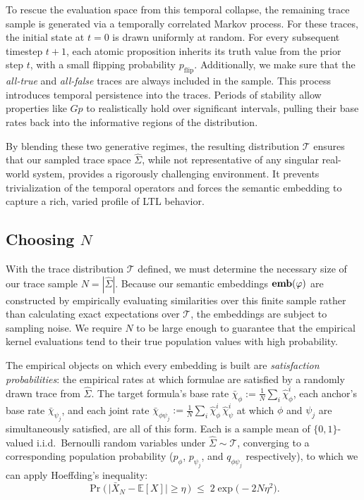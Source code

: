 \documentclass[titlepage,a4paper,11pt]{report}
\begin{document}
    To rescue the evaluation space from this temporal collapse, the remaining trace sample is generated via a temporally correlated Markov process. For these traces, the initial state at $t=0$ is drawn uniformly at random. For every subsequent timestep $t+1$, each atomic proposition inherits its truth value from the prior step $t$, with a small flipping probability $p_{\text{flip}}$. Additionally, we make sure that the \textit{all-true} and \textit{all-false} traces are always included in the sample. This process introduces temporal persistence into the traces. Periods of stability allow properties like $G p$ to realistically hold over significant intervals, pulling their base rates back into the informative regions of the distribution. 
    
    By blending these two generative regimes, the resulting distribution $\mathcal{T}$ ensures that our sampled trace space $\widehat \Sigma$, while not representative of any singular real-world system, provides a rigorously challenging environment. It prevents trivialization of the temporal operators and forces the semantic embedding to capture a rich, varied profile of LTL behavior.

    \subsection{Choosing $N$}\label{sec:choosing_n}
    With the trace distribution $\mathcal{T}$ defined, we must determine the necessary size of our trace sample $N = |\widehat{\Sigma}|$. Because our semantic embeddings $\textbf{emb}(\varphi)$ are constructed by empirically evaluating similarities over this finite sample rather than calculating exact expectations over $\mathcal{T}$, the embeddings are subject to sampling noise. We require $N$ to be large enough to guarantee that the empirical kernel evaluations tend to their true population values with high probability.

    The empirical objects on which every embedding is built are \emph{satisfaction probabilities}: the empirical rates at which formulae are satisfied by a randomly drawn trace from $\widehat\Sigma$. The target formula's base rate $\bar\chi_\phi := \tfrac{1}{N}\sum_i \widehat\chi^i_\phi$, each anchor's base rate $\bar\chi_{\psi_j}$, and each joint rate $\bar\chi_{\phi\psi_j} := \tfrac{1}{N}\sum_i \widehat\chi^i_\phi\, \widehat\chi^i_\psi$ at which $\phi$ and $\psi_j$ are simultaneously satisfied, are all of this form. Each is a sample mean of $\{0,1\}$-valued i.i.d.\ Bernoulli random variables under $\widehat\Sigma \sim \mathcal{T}$, converging to a corresponding population probability ($p_\phi$, $p_{\psi_j}$, and $q_{\phi\psi_j}$ respectively), to which we can apply Hoeffding's inequality:
    \begin{equation}\label{eq:hoeffding_bernoulli}
        \Pr\!\Big(\, \bigl|\bar X_N - \mathbb{E}[X]\bigr| \ge \eta \,\Big) \;\le\; 2 \exp\!\bigl(-2N\eta^2\bigr).
    \end{equation}
\end{document}
